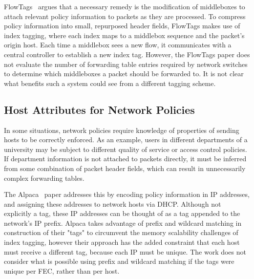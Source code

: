 FlowTags~\cite{flowtags} argues that a necessary remedy is the modification of
middleboxes to attach relevant policy information to packets as they are
processed. To compress policy information into small, repurposed header fields,
FlowTags makes use of index tagging, where each index maps to a middlebox
sequence and the packet's origin host. Each time a middlebox sees a new flow, it
communicates with a central controller to establish a new index tag.  However,
the FlowTags paper does not evaluate the number of forwarding table entries
required by network switches to determine which middleboxes a packet should be
forwarded to. It is not clear what benefits such a system could see from a
different tagging scheme. 
 

\subsection{Host Attributes for Network Policies} In some situations, network
policies require knowledge of properties of sending hosts to be correctly
enforced. As an example, users in different departments of a university may be
subject to different quality of service or access control policies. If
department information is not attached to packets directly, it must be inferred
from some combination of packet header fields, which can result in unnecessarily
complex forwarding tables. 

The Alpaca~\cite{alpaca} paper addresses this by encoding policy information in
IP addresses, and assigning these addresses to network hosts via DHCP. Although
not explicitly a tag, these IP addresses can be thought of as a tag appended to
the network's IP prefix. Alpaca takes advantage of prefix and wildcard matching
in construction of their "tags" to circumvent the memory scalability challenges
of index tagging, however their approach has the added constraint that each host
must receive a different tag, because each IP must be unique. The work does not
consider what is possible using prefix and wildcard matching if the tags were
unique per FEC, rather than per host.


